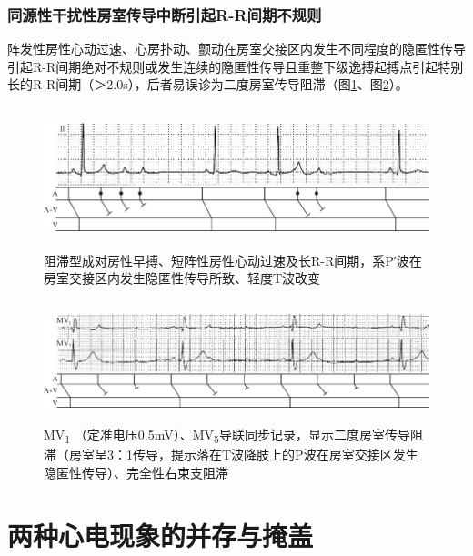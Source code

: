 \protect\hypertarget{text00042.htmlux5cux23subid464}{}{}

\subsection{同源性干扰性房室传导中断引起R-R间期不规则}

阵发性房性心动过速、心房扑动、颤动在房室交接区内发生不同程度的隐匿性传导引起R-R间期绝对不规则或发生连续的隐匿性传导且重整下级逸搏起搏点引起特别长的R-R间期（＞2.0s），后者易误诊为二度房室传导阻滞（图\ref{fig35-18}、图\ref{fig35-19}）。

\begin{figure}[!htbp]
 \centering
 \includegraphics[width=5.76042in,height=1.61458in]{./images/Image00571.jpg}
 \captionsetup{justification=centering}
 \caption{阻滞型成对房性早搏、短阵性房性心动过速及长R-R间期，系P′波在房室交接区内发生隐匿性传导所致、轻度T波改变}
 \label{fig35-18}
  \end{figure} 

\begin{figure}[!htbp]
 \centering
 \includegraphics[width=5.78125in,height=1.39583in]{./images/Image00572.jpg}
 \captionsetup{justification=centering}
 \caption{MV\textsubscript{1} （定准电压0.5mV）、MV\textsubscript{5}导联同步记录，显示二度房室传导阻滞（房室呈3：1传导，提示落在T波降肢上的P波在房室交接区发生隐匿性传导）、完全性右束支阻滞}
 \label{fig35-19}
  \end{figure} 


\protect\hypertarget{text00043.html}{}{}

\protect\hypertarget{text00043.htmlux5cux23chapter43}{}{}

\chapter{两种心电现象的并存与掩盖}

